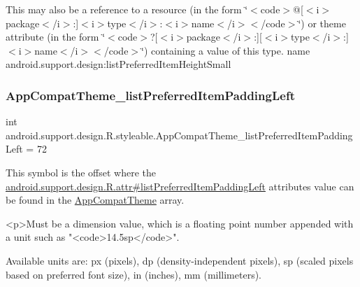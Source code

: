 This may also be a reference to a resource (in the form \char`\"{}$<$code$>$@\mbox{[}$<$i$>$package$<$/i$>$\+:\mbox{]}$<$i$>$type$<$/i$>$\+:$<$i$>$name$<$/i$>$$<$/code$>$\char`\"{}) or theme attribute (in the form \char`\"{}$<$code$>$?\mbox{[}$<$i$>$package$<$/i$>$\+:\mbox{]}\mbox{[}$<$i$>$type$<$/i$>$\+:\mbox{]}$<$i$>$name$<$/i$>$$<$/code$>$\char`\"{}) containing a value of this type.  name android.\+support.\+design\+:list\+Preferred\+Item\+Height\+Small \mbox{\label{classandroid_1_1support_1_1design_1_1R_1_1styleable_abd5288e1dbcfcf3972724d7aded718da}} 
\subsubsection{\texorpdfstring{App\+Compat\+Theme\+\_\+list\+Preferred\+Item\+Padding\+Left}{AppCompatTheme\_listPreferredItemPaddingLeft}}
{\footnotesize\ttfamily int android.\+support.\+design.\+R.\+styleable.\+App\+Compat\+Theme\+\_\+list\+Preferred\+Item\+Padding\+Left = 72\hspace{0.3cm}{\ttfamily [static]}}

This symbol is the offset where the \hyperlink{classandroid_1_1support_1_1design_1_1R_1_1attr_a8f6dc9aede7141a5cd6d4242cdb5cf80}{android.\+support.\+design.\+R.\+attr\#list\+Preferred\+Item\+Padding\+Left} attribute\textquotesingle{}s value can be found in the \hyperlink{classandroid_1_1support_1_1design_1_1R_1_1styleable_afb351dc8de20cbd4c89abe360373010c}{App\+Compat\+Theme} array.

\begin{DoxyVerb}      <p>Must be a dimension value, which is a floating point number appended with a unit such as "<code>14.5sp</code>".
\end{DoxyVerb}
 Available units are\+: px (pixels), dp (density-\/independent pixels), sp (scaled pixels based on preferred font size), in (inches), mm (millimeters). 

